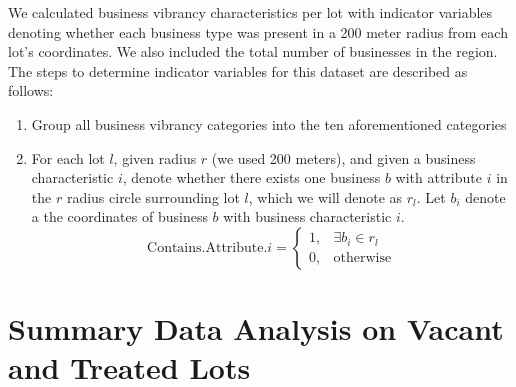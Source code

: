\documentclass{article}
\begin{document}
We calculated business vibrancy characteristics per lot with indicator variables denoting whether each business type was present in a 200 meter radius from each lot’s coordinates. We also included the total number of businesses in the region. The steps to determine indicator variables for this dataset are described as follows:
\begin{enumerate}
    \item Group all business vibrancy categories into the ten aforementioned categories
    \item For each lot $l$, given radius $r$ (we used 200 meters), and given a business characteristic $i$, denote whether there exists one business $b$ with attribute $i$ in the $r$ radius circle surrounding lot $l$, which we will denote as $r_l$. Let $b_i$ denote a the coordinates of business $b$ with business characteristic $i$. 
    \begin{equation}
        \text{Contains.Attribute.}i =
        \begin{cases}
        1, & \exists b_i \in r_l \\
        0, & \text{otherwise}
        \end{cases}
    \end{equation}
\end{enumerate}
\section{Summary Data Analysis on Vacant and Treated Lots}
\end{document}
